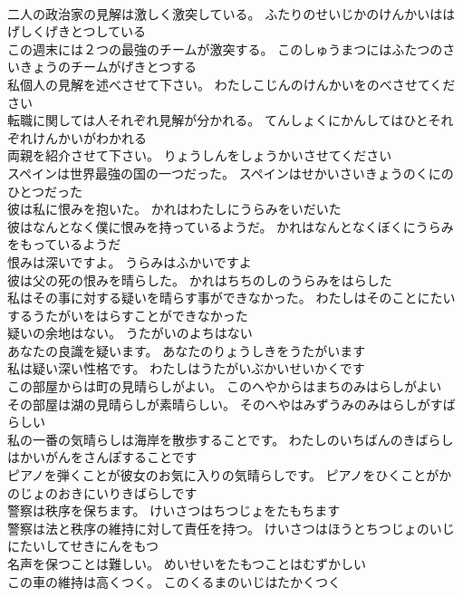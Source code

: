 \documentclass[8pt]{extreport}
\begin{document}
\begin{CJK}{UTF8}{min}
\\	二人の政治家の見解は激しく激突している。	ふたりのせいじかのけんかいははげしくげきとつしている 
\\	この週末には２つの最強のチームが激突する。	このしゅうまつにはふたつのさいきょうのチームがげきとつする 
\\	私個人の見解を述べさせて下さい。	わたしこじんのけんかいをのべさせてください 
\\	転職に関しては人それぞれ見解が分かれる。	てんしょくにかんしてはひとそれぞれけんかいがわかれる 
\\	両親を紹介させて下さい。	りょうしんをしょうかいさせてください 
\\	スペインは世界最強の国の一つだった。	スペインはせかいさいきょうのくにのひとつだった 
\\	彼は私に恨みを抱いた。	かれはわたしにうらみをいだいた 
\\	彼はなんとなく僕に恨みを持っているようだ。	かれはなんとなくぼくにうらみをもっているようだ 
\\	恨みは深いですよ。	うらみはふかいですよ 
\\	彼は父の死の恨みを晴らした。	かれはちちのしのうらみをはらした 
\\	私はその事に対する疑いを晴らす事ができなかった。	わたしはそのことにたいするうたがいをはらすことができなかった 
\\	疑いの余地はない。	うたがいのよちはない 
\\	あなたの良識を疑います。	あなたのりょうしきをうたがいます 
\\	私は疑い深い性格です。	わたしはうたがいぶかいせいかくです 
\\	この部屋からは町の見晴らしがよい。	このへやからはまちのみはらしがよい 
\\	その部屋は湖の見晴らしが素晴らしい。	そのへやはみずうみのみはらしがすばらしい 
\\	私の一番の気晴らしは海岸を散歩することです。	わたしのいちばんのきばらしはかいがんをさんぽすることです 
\\	ピアノを弾くことが彼女のお気に入りの気晴らしです。	ピアノをひくことがかのじょのおきにいりきばらしです 
\\	警察は秩序を保ちます。	けいさつはちつじょをたもちます 
\\	警察は法と秩序の維持に対して責任を持つ。	けいさつはほうとちつじょのいじにたいしてせきにんをもつ 
\\	名声を保つことは難しい。	めいせいをたもつことはむずかしい 
\\	この車の維持は高くつく。	このくるまのいじはたかくつく 

\end{CJK}
\end{document}
